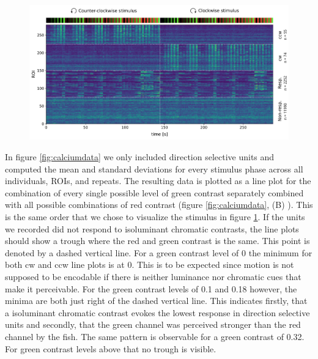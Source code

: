 \vspace{\baselineskip}

\begin{figure}[ht]
    \centering
    \includegraphics[width=\linewidth]{figures/testimg.pdf}
    \label{fig:heatmap}
\end{figure}

In figure \ref{fig:calciumdata} we only included direction selective units and computed the mean and standard deviations for every stimulus phase across all individuals, ROIs, and repeats. The resulting data is plotted as a line plot for the combination of every single possible level of green contrast separately combined with all possible combinations of red contrast (figure \ref{fig:calciumdata}, (B) ). This is the same order that we chose to visualize the stimulus in figure \ref{fig:heatmap}. If the units we recorded did not respond to isoluminant chromatic contrasts, the line plots should show a trough where the red and green contrast is the same. This point is denoted by a dashed vertical line. For a green contrast level of 0 the minimum for both cw and ccw line plots is at 0. This is to be expected since motion is not supposed to be encodable if there is neither luminance nor chromatic cues that make it perceivable. For the green contrast levels of 0.1 and 0.18 however, the minima are both just right of the dashed vertical line. This indicates firstly, that a isoluminant chromatic contrast evokes the lowest response in direction selective units and secondly, that the green channel was perceived stronger than the red channel by the fish. The same pattern is observable for a green contrast of 0.32. For green contrast levels above that no trough is visible. 

